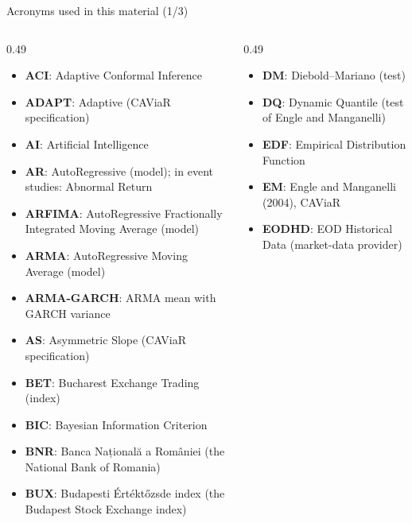 {
\begin{frame}[noframenumbering]
    \titlepage
\end{frame}
}
\begin{frame}{Acronyms used in this material (1/3)}
\begin{columns}[T]
\begin{column}{0.49\textwidth}
\begin{itemize}\setlength{\itemsep}{0pt}
    \item \textbf{ACI}: Adaptive Conformal Inference
    \item \textbf{ADAPT}: Adaptive (CAViaR specification)
    \item \textbf{AI}: Artificial Intelligence
    \item \textbf{AR}: AutoRegressive (model); in event studies: Abnormal Return
    \item \textbf{ARFIMA}: AutoRegressive Fractionally Integrated Moving Average (model)
    \item \textbf{ARMA}: AutoRegressive Moving Average (model)
    \item \textbf{ARMA-GARCH}: ARMA mean with GARCH variance
    \item \textbf{AS}: Asymmetric Slope (CAViaR specification)
    \item \textbf{BET}: Bucharest Exchange Trading (index)
    \item \textbf{BIC}: Bayesian Information Criterion
    \item \textbf{BNR}: Banca Națională a României (the National Bank of Romania)
    \item \textbf{BUX}: Budapesti Értéktőzsde index (the Budapest Stock Exchange index)
\end{itemize}
\end{column}
\begin{column}{0.49\textwidth}
\begin{itemize}\setlength{\itemsep}{0pt}
    \item \textbf{DM}: Diebold–Mariano (test)
    \item \textbf{DQ}: Dynamic Quantile (test of Engle and Manganelli)
    \item \textbf{EDF}: Empirical Distribution Function
    \item \textbf{EM}: Engle and Manganelli (2004), CAViaR
    \item \textbf{EODHD}: EOD Historical Data (market-data provider)

\end{itemize}
\end{column}
\end{columns}
\end{frame}
